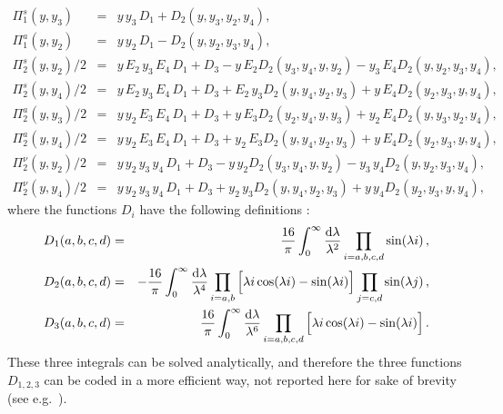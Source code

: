 \documentclass[notitlepage,nofootinbib,showpacs,preprintnumbers,amsmath,amssymb,superscriptaddress,prd,onecolumn]{revtex4-1}
\begin{document}
\begin{eqnarray}
\Pi_1^s(y,y_3)
&=&
y\,y_3\,D_1+D_2(y,y_3,y_2,y_4),
\\
\Pi_1^a(y,y_2)
&=&
y\,y_2\,D_1-D_2(y,y_2,y_3,y_4),
\\
\Pi_2^s(y,y_2)/2
&=&
y\,E_2\,y_3\,E_4\,D_1 + D_3 - y\,E_2 D_2(y_3,y_4,y,y_2) - y_3\,E_4 D_2(y,y_2,y_3,y_4),
\\
\Pi_2^s(y,y_4)/2
&=&
y\,E_2\,y_3\,E_4\,D_1 + D_3 + E_2\,y_3 D_2(y,y_4,y_2,y_3) + y\,E_4 D_2(y_2,y_3,y,y_4),
\\
\Pi_2^a(y,y_3)/2
&=&
y\,y_2\,E_3\,E_4\,D_1 + D_3 + y\,E_3 D_2(y_2,y_4,y,y_3) + y_2\,E_4 D_2(y,y_3,y_2,y_4),
\\
\Pi_2^a(y,y_4)/2
&=&
y\,y_2\,E_3\,E_4\,D_1 + D_3 + y_2\,E_3 D_2(y,y_4,y_2,y_3) + y\,E_4 D_2(y_2,y_3,y,y_4),
\\
\Pi_2^\nu(y,y_2)/2
&=&
y\,y_2\,y_3\,y_4\,D_1 + D_3 - y\,y_2 D_2(y_3,y_4,y,y_2) - y_3\,y_4 D_2(y,y_2,y_3,y_4),
\\
\Pi_2^\nu(y,y_4)/2
&=&
y\,y_2\,y_3\,y_4\,D_1 + D_3 + y_2\,y_3 D_2(y,y_4,y_2,y_3) + y\,y_4 D_2(y_2,y_3,y,y_4),
\end{eqnarray}
%
where the functions $D_i$ have the following definitions \cite{Dolgov:1997mb}:
%
\begin{eqnarray}
D_1(a,b,c,d)
&=&
\frac{16}{\pi}
\int_0^\infty
\frac{{\rm d}\lambda}{\lambda^2}
\prod_{i=a,b,c,d}\sin(\lambda i)
\,,\\
D_2(a,b,c,d)
&=&
-\frac{16}{\pi}
\int_0^\infty
\frac{{\rm d}\lambda}{\lambda^4}
\prod_{i=a,b}\Big[\lambda i \cos(\lambda i)-\sin(\lambda i)\Big]
\prod_{j=c,d}\sin(\lambda j)
\,,\\
D_3(a,b,c,d)
&=&
\frac{16}{\pi}
\int_0^\infty
\frac{\mathrm{d}\lambda}{\lambda^6}
\prod_{i=a,b,c,d}\Big[\lambda i \cos(\lambda i)-\sin(\lambda i)\Big]
\,.
\end{eqnarray}
These three integrals can be solved analytically,
and therefore the three functions $D_{1, 2, 3}$ can be coded in a more efficient way,
not reported here for sake of brevity
(see e.g.~\cite{Blaschke:2016xxt}).
\end{document}
